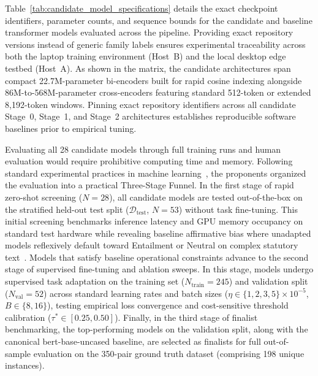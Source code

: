     Table~\ref{tab:candidate_model_specifications} details the exact checkpoint identifiers, parameter counts, and sequence bounds for the candidate and baseline transformer models evaluated across the pipeline. Providing exact repository versions instead of generic family labels ensures experimental traceability across both the laptop training environment (Host~B) and the local desktop edge testbed (Host~A). As shown in the matrix, the candidate architectures span compact 22.7M-parameter bi-encoders built for rapid cosine indexing alongside 86M-to-568M-parameter cross-encoders featuring standard 512-token or extended 8,192-token windows. Pinning exact repository identifiers across all candidate Stage~0, Stage~1, and Stage~2 architectures establishes reproducible software baselines prior to empirical tuning.

    Evaluating all 28 candidate models through full training runs and human evaluation would require prohibitive computing time and memory. Following standard experimental practices in machine learning~\cite{dodge2019show, caruana2004ensemble}, the proponents organized the evaluation into a practical Three-Stage Funnel. In the first stage of rapid zero-shot screening ($N = 28$), all candidate models are tested out-of-the-box on the stratified held-out test split ($\mathcal{D}_{\text{test}}$, $N = 53$) without task fine-tuning. This initial screening benchmarks inference latency and GPU memory occupancy on standard test hardware while revealing baseline affirmative bias where unadapted models reflexively default toward Entailment or Neutral on complex statutory text~\cite{alshehri2026cross, tran2026enhancing}. Models that satisfy baseline operational constraints advance to the second stage of supervised fine-tuning and ablation sweeps. In this stage, models undergo supervised task adaptation on the training set ($N_{\text{train}} = 245$) and validation split ($N_{\text{val}} = 52$) across standard learning rates and batch sizes ($\eta \in \{1, 2, 3, 5\} \times 10^{-5}$, $B \in \{8, 16\}$), testing empirical loss convergence and cost-sensitive threshold calibration ($\tau^* \in [0.25, 0.50]$). Finally, in the third stage of finalist benchmarking, the top-performing models on the validation split, along with the canonical bert-base-uncased baseline, are selected as finalists for full out-of-sample evaluation on the 350-pair ground truth dataset (comprising 198 unique instances).

